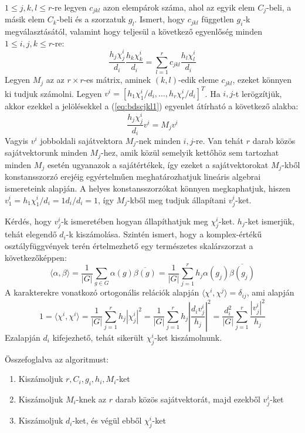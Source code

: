 $1 \le j, k, l \le r$-re legyen $c_{jkl}$ azon elempárok száma, ahol az egyik elem $C_j$-beli, a másik elem $C_k$-beli és a szorzatuk $g_l$.
Ismert, hogy $c_{jkl}$ független $g_i$-k megválasztásától, valamint hogy teljesül a következő egyenlőség minden $1 \le i, j, k \le r$-re:
\begin{equation}
\label{eq:bdscjkl1}
\frac{h_j\chi^i_j}{d_i}\frac{h_k\chi^i_k}{d_i}=\sum_{l=1}^r c_{jkl}\frac{h_l\chi^i_l}{d_i}
\end{equation}
Legyen $M_j$ az az $r\times r$-es mátrix, aminek $(k,l)$-edik eleme $c_{jkl}$, ezeket könnyen ki tudjuk számolni.
Legyen $v^i=[h_1\chi^i_1/d_i, \dots, h_r\chi^i_r/d_i]^T$.
Ha $i, j$-t lerögzítjük, akkor ezekkel a jelölésekkel a (\ref{eq:bdscjkl1}) egyenlet átírható a következő alakba:
\begin{equation}
\label{eq:bdscjkl2}
\frac{h_j\chi^i_j}{d_i}v^i=M_j v^i
\end{equation}
Vagyis $v^i$ jobboldali sajátvektora $M_j$-nek minden $i, j$-re.
Van tehát $r$ darab közös sajátvektorunk minden $M_j$-hez, amik közül semelyik kettőhöz sem tartozhat minden $M_j$ esetén ugyanazok a sajátértékek,
így ezeket a sajátvektorokat $M_j$-kből konstansszorzó erejéig egyértelműen meghatározhatjuk lineáris algebrai ismereteink alapján.
A helyes konstansszorzókat könnyen megkaphatjuk, hiszen $v^i_1=h_1\chi^i_1/d_i=1 d_i/d_i=1$, így $M_j$-kből meg tudjuk állapítani $v^i_j$-ket.

Kérdés, hogy $v^i_j$-k ismeretében hogyan állapíthatjuk meg $\chi^i_j$-ket.
$h_j$-ket ismerjük, tehát elegendő $d_i$-k kiszámolása.
Szintén ismert, hogy a komplex-értékű osztályfüggvények terén értelmezhető egy természetes skalárszorzat a következőképpen:
\begin{equation}
\label{eq:bdsscalar}
\langle \alpha, \beta \rangle = \frac{1}{|G|}\sum_{g\in G}\alpha(g)\overline{\beta(g)} = \frac{1}{|G|}\sum_{j=1}^r h_j \alpha(g_j) \overline{\beta(g_j)}
\end{equation}
A karakterekre vonatkozó ortogonális relációk alapján $\langle \chi^i, \chi^j \rangle = \delta_{ij}$, ami alapján
\begin{equation}
\label{eq:bdsdi1}
1 = \langle \chi^i, \chi^i \rangle = \frac{1}{|G|}\sum_{j=1}^r h_j |\chi^i_j|^2 = \frac{1}{|G|}\sum_{j=1}^r h_j \left|\frac{d_i v^i_j}{h_j}\right|^2 = 
\frac{d_i^2}{|G|}\sum_{j=1}^r \frac{|v^i_j|^2}{h_j}
\end{equation}
Ezalapján $d_i$ kifejezhető, tehát sikerült $\chi^i_j$-ket kiszámolnunk.

\noindent
Összefoglalva az algoritmust:
\begin{enumerate}
\item Kiszámoljuk $r, C_i, g_i, h_i, M_i$-ket
\item Kiszámoljuk $M_i$-knek az $r$ darab közös sajátvektorát, majd ezekből $v^i_j$-ket
\item Kiszámoljuk $d_i$-ket, és végül ebből $\chi^i_j$-ket
\end{enumerate}

